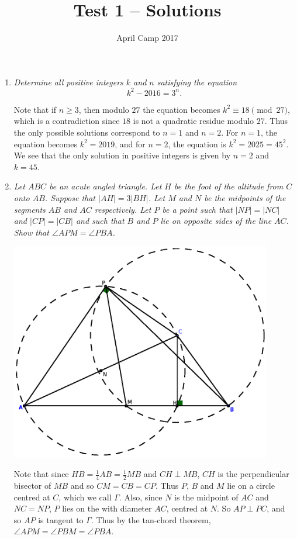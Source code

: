 \documentclass[a4paper,12pt]{article}
\author{April Camp 2017}
\title{Test 1 -- Solutions}
\date{}
\begin{document}
 \maketitle

\begin{enumerate}
	\item 
	\textit{Determine all positive integers $k$ and $n$ satisfying the equation $$k^2 - 2016 = 3^n.$$}
	
    Note that if $n \geq 3$, then modulo $27$ the equation becomes $k^2 \equiv
    18 \pmod{27}$, which is a contradiction since $18$ is not a quadratic residue
    modulo $27$. Thus the only possible solutions correspond to $n=1$ and
    $n=2$. For $n=1$, the equation becomes $k^2 = 2019$, and for $n=2$, the
    equation is $k^2 = 2025 = 45^2$. We see that the only solution in
    positive integers is given by $n=2$ and $k=45$.
		
	\item 
	\textit{Let $ABC$ be an acute angled triangle. Let $H$ be the foot of the altitude from $C$ onto $AB$. Suppose that $|AH|=3|BH|$. Let $M$ and $N$ be the midpoints of the segments $AB$ and $AC$ respectively. Let $P$ be a point such that $|NP|=|NC|$ and $|CP|=|CB|$ and such that $B$ and $P$ lie on opposite sides of the line $AC$. Show that $\angle APM = \angle PBA$.}
	
	{\centering \includegraphics[width=0.9\textwidth]{T1Q2.eps}}
	
	Note that since $HB =\frac{1}{4}AB =\frac{1}{2}MB$ and $CH \perp MB$, $CH$ is the perpendicular bisector of $MB$ and so $CM=CB=CP$. Thus $P$, $B$ and $M$ lie on a circle centred at $C$, which we call $\Gamma$. Also, since $N$ is the midpoint of $AC$ and $NC=NP$, $P$ lies on the with diameter $AC$, centred at $N$. So $AP \perp PC$, and so $AP$ is tangent to $\Gamma$. Thus by the tan-chord theorem, $\angle APM =\angle PBM =\angle PBA$.
	

\end{enumerate}
\end{document}
